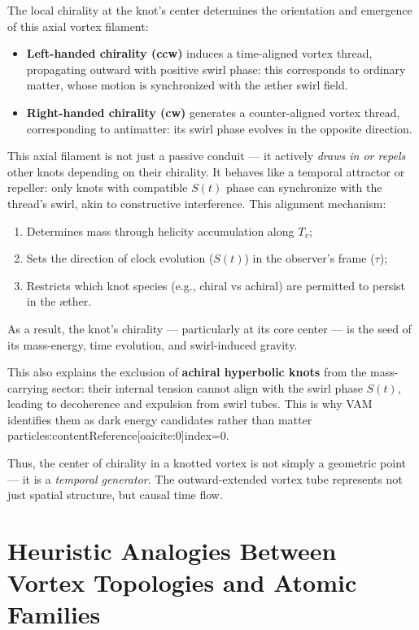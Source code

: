 The local chirality at the knot’s center determines the orientation and emergence of this axial vortex filament:
\begin{itemize}
    \item \textbf{Left-handed chirality (ccw)} induces a time-aligned vortex thread, propagating outward with positive swirl phase: this corresponds to ordinary matter, whose motion is synchronized with the æther swirl field.
    \item \textbf{Right-handed chirality (cw)} generates a counter-aligned vortex thread, corresponding to antimatter: its swirl phase evolves in the opposite direction.
\end{itemize}

\noindent This axial filament is not just a passive conduit — it actively \textit{draws in or repels} other knots depending on their chirality. It behaves like a temporal attractor or repeller: only knots with compatible $S(t)$ phase can synchronize with the thread’s swirl, akin to constructive interference. This alignment mechanism:
\begin{enumerate}
    \item Determines mass through helicity accumulation along $T_v$;
    \item Sets the direction of clock evolution ($S(t)$) in the observer's frame ($\tau$);
    \item Restricts which knot species (e.g., chiral vs achiral) are permitted to persist in the æther.
\end{enumerate}

As a result, the knot’s chirality — particularly at its core center — is the seed of its mass-energy, time evolution, and swirl-induced gravity.

This also explains the exclusion of \textbf{achiral hyperbolic knots} from the mass-carrying sector: their internal tension cannot align with the swirl phase $S(t)$, leading to decoherence and expulsion from swirl tubes. This is why VAM identifies them as dark energy candidates rather than matter particles:contentReference[oaicite:0]{index=0}.

Thus, the center of chirality in a knotted vortex is not simply a geometric point — it is a \textit{temporal generator}. The outward-extended vortex tube represents not just spatial structure, but causal time flow.

\section{Heuristic Analogies Between Vortex Topologies and Atomic Families}

